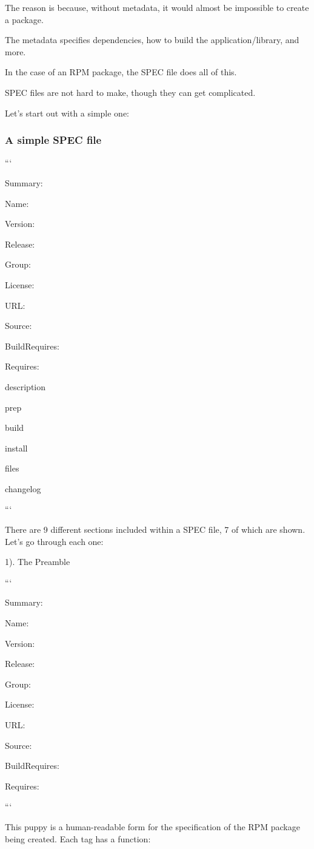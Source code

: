 The reason is because, without metadata, it would almost be impossible to create a package.

The metadata specifies dependencies, how to build the application/library, and more.

In the case of an R\-P\-M package, the S\-P\-E\-C file does all of this.

S\-P\-E\-C files are not hard to make, though they can get complicated.

Let's start out with a simple one\-:

\subsubsection*{A simple S\-P\-E\-C file}

```

Summary\-:

Name\-:

Version\-:

Release\-:

Group\-:

License\-:

U\-R\-L\-:

Source\-:

Build\-Requires\-:

Requires\-:

description

prep

build

install

files

changelog

```

There are 9 different sections included within a S\-P\-E\-C file, 7 of which are shown. Let's go through each one\-:

1). The Preamble

```

Summary\-:

Name\-:

Version\-:

Release\-:

Group\-:

License\-:

U\-R\-L\-:

Source\-:

Build\-Requires\-:

Requires\-:

```

This puppy is a human-\/readable form for the specification of the R\-P\-M package being created. Each tag has a function\-:

